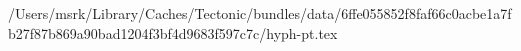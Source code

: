 /Users/msrk/Library/Caches/Tectonic/bundles/data/6ffe055852f8faf66c0acbe1a7fb27f87b869a90bad1204f3bf4d9683f597c7c/hyph-pt.tex